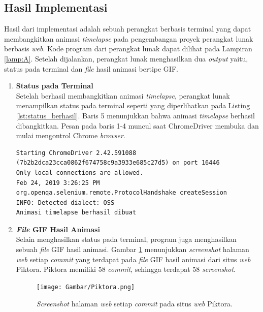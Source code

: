 \subsection{Hasil Implementasi}
\label{subsec:lingkunganimplementasi}
Hasil dari implementasi adalah sebuah perangkat berbasis terminal yang dapat membangkitkan animasi \textit{timelapse} pada pengembangan proyek perangkat lunak berbasis \textit{web}. Kode program dari perangkat lunak dapat dilihat pada Lampiran \ref{lamp:A}. Setelah dijalankan, perangkat lunak menghasilkan dua \textit{output} yaitu, status pada terminal dan \textit{file} hasil animasi bertipe GIF.
\begin{enumerate}
\item \textbf{Status pada Terminal}\\
Setelah berhasil membangkitkan animasi \textit{timelapse}, perangkat lunak menampilkan status pada terminal seperti yang diperlihatkan pada Listing \ref{lst:status_berhasil}. Baris 5 menunjukkan bahwa animasi \textit{timelapse} berhasil dibangkitkan. Pesan pada baris 1-4 muncul saat ChromeDriver membuka dan mulai mengontrol Chrome \textit{browser}.

\begin{lstlisting}[caption={Status pesan pada terminal saat program berhasil membangkitkan animasi \textit{timelapse}.},label={lst:status_berhasil},language=plaintext]
Starting ChromeDriver 2.42.591088 (7b2b2dca23cca0862f674758c9a3933e685c27d5) on port 16446
Only local connections are allowed.
Feb 24, 2019 3:26:25 PM org.openqa.selenium.remote.ProtocolHandshake createSession
INFO: Detected dialect: OSS
Animasi timelapse berhasil dibuat
\end{lstlisting}

\item \textbf{\textit{File} GIF Hasil Animasi}\\
Selain menghasilkan status pada terminal, program juga menghasilkan sebuah \textit{file} GIF hasil animasi.
Gambar \ref{fig:c1} menunjukkan \textit{screenshot} halaman \textit{web} setiap \textit{commit} yang terdapat pada \textit{file} GIF hasil animasi dari situs \textit{web} Piktora. Piktora memiliki 58 \textit{commit}, sehingga terdapat 58 \textit{screenshot}. 


\begin{figure}[H]
	
		\texttt{[image: Gambar/Piktora.png]}
	\caption{ \textit{Screenshot} halaman \textit{web} setiap \textit{commit} pada situs \textit{web} Piktora. }
	\label{fig:c1}
\end{figure}





\end{enumerate}
